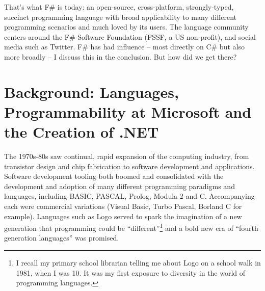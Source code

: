 \documentclass[acmsmall]{acmart}\settopmatter{}
\begin{document}
That's what F\# is today: an open-source, cross-platform, strongly-typed, succinct programming language with broad applicability
to many different programming scenarios and much loved by its users.  The language community centers around
the F\# Software Foundation (FSSF, a US non-profit), and social media such as Twitter. F\# has had influence – most
directly on C\# but also more broadly – I discuss this in the conclusion.  But how did we get there?

\section*{Background: Languages, Programmability at Microsoft and the Creation of .NET}

The 1970s-80s saw continual, rapid expansion of the computing industry, from transistor design and chip fabrication to
software development and applications. Software development tooling both boomed and consolidated with the development
and adoption of many different programming paradigms and languages, including BASIC, PASCAL, Prolog, Modula 2 and C.  Accompanying
each were commercial variations (Visual Basic, Turbo Pascal, Borland C for example). Languages such as Logo served to spark
the imagination of a new generation that programming could be “different”\footnote{ I recall my primary school librarian telling me
about Logo on a school walk in 1981, when I was 10. It was my first exposure to diversity in the world of programming languages.} and a
bold new era of “fourth generation languages” was promised. 
\end{document}

